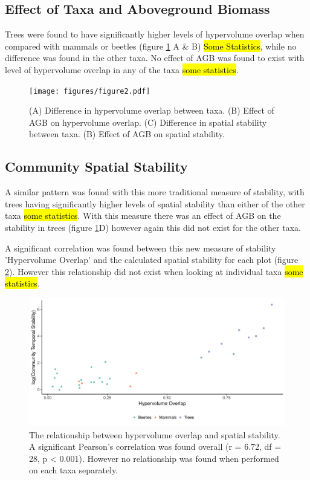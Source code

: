 \subsection{Effect of Taxa and Aboveground Biomass}

Trees were found to have significantly higher levels of hypervolume overlap when compared with mammals or beetles (figure \ref{fig:2} A \& B) \hl{Some Statistics}, while no difference was found in the other taxa. No effect of AGB was found to exist with level of hypervolume overlap in any of the taxa \hl{some statistics}.

\begin{figure}[H]
	\centering
	\texttt{[image: figures/figure2.pdf]}
	\caption{(A) Difference in hypervolume overlap between taxa. (B) Effect of AGB on hypervolume overlap. (C) Difference in spatial stability between taxa. (B) Effect of AGB on spatial stability.}
	\label{fig:2}
\end{figure}


\subsection{Community Spatial Stability}

A similar pattern was found with this more traditional measure of stability, with trees having significantly higher levels of spatial stability than either of the other taxa \hl{some statistics}. With this measure there was an effect of AGB on the stability in trees (figure \ref{fig:2}D) however again this did not exist for the other taxa.


A significant correlation was found between this new measure of stability 'Hypervolume Overlap' and the calculated spatial stability for each plot (figure \ref{fig:3}). However this relationship did not exist when looking at individual taxa \hl{some statistics}.

\begin{figure}[H]	
	\centering
	\includegraphics[width=\textwidth]{figures/figure3.pdf}
	\caption{The relationship between hypervolume overlap and spatial stability. A significant Pearson's correlation was found overall (r = 6.72, df = 28, p < 0.001). However no relationship was found when performed on each taxa separately.}
	\label{fig:3}
\end{figure}
